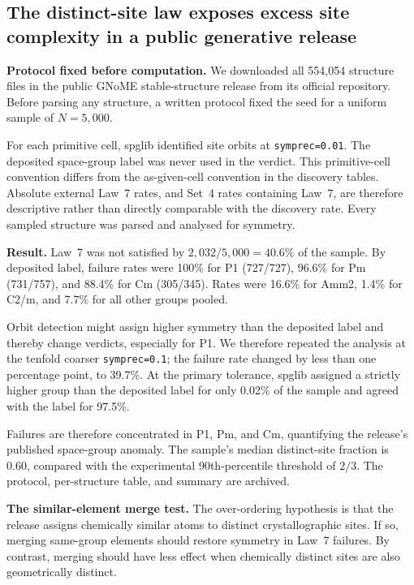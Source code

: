 \subsection{The distinct-site law exposes excess site complexity in a public generative
release}\label{si-note:s17-gnome}

\textbf{Protocol fixed before computation.} We downloaded all 554{,}054 structure
files in the public GNoME stable-structure release from its official repository.
Before parsing any structure, a written protocol fixed the seed for a uniform
sample of $N=5{,}000$.

For each primitive cell, spglib identified site orbits at
\texttt{symprec=0.01}. The deposited space-group label was never used in the
verdict. This primitive-cell convention differs from the as-given-cell convention
in the discovery tables. Absolute external Law~7 rates, and Set~4 rates containing
Law~7, are therefore descriptive rather than directly comparable with the
discovery rate. Every sampled structure was parsed and analysed for symmetry.

\textbf{Result.} Law~7 was not satisfied by $2{,}032/5{,}000=40.6\%$ of the
sample. By deposited label, failure rates were 100\% for P1 (727/727), 96.6\% for
Pm (731/757), and 88.4\% for Cm (305/345). Rates were 16.6\% for Amm2, 1.4\% for
C2/m, and 7.7\% for all other groups pooled.

Orbit detection might assign higher symmetry than the deposited label and
thereby change verdicts, especially for P1. We therefore repeated the analysis at
the tenfold coarser \texttt{symprec=0.1}; the failure rate changed by less than
one percentage point, to 39.7\%. At the primary tolerance, spglib assigned a
strictly higher group than the deposited label for only 0.02\% of the sample and
agreed with the label for 97.5\%.

Failures are therefore concentrated in P1, Pm, and Cm, quantifying the release's
published space-group anomaly. The sample's median distinct-site fraction is
0.60, compared with the experimental 90th-percentile
threshold of $2/3$. The
protocol, per-structure table, and summary are archived.

\textbf{The similar-element merge test.} The over-ordering hypothesis is that
the release assigns chemically similar atoms to distinct crystallographic sites.
If so, merging same-group elements should restore symmetry in Law~7 failures.
By contrast, merging should have less effect when chemically distinct sites are
also geometrically distinct.

